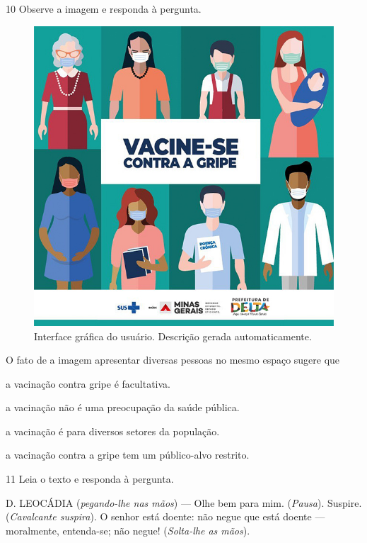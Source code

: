 \num{10} Observe a imagem e responda à pergunta.
 
\begin{figure}[htpb!]
\centering
\includegraphics[width=.7\textwidth]{./imgQ4PORT/media/image7.jpeg}
\caption{Interface gráfica do usuário. Descrição gerada automaticamente.}
\end{figure}


O fato de a imagem apresentar diversas pessoas no mesmo espaço sugere
que

\begin{escolha}
  \item a vacinação contra gripe é facultativa.

  \item a vacinação não é uma preocupação da saúde pública.

  \item a vacinação é para diversos setores da população.

  \item a vacinação contra a gripe tem um público-alvo restrito.
\end{escolha}

\num{11} Leia o texto e responda à pergunta.

\begin{myquote}
D. LEOCÁDIA (\textit{pegando-lhe nas mãos}) --- Olhe bem para mim. 
(\textit{Pausa}). Suspire. (\textit{Cavalcante suspira}). O senhor está
doente: não negue que está doente --- moralmente, entenda-se; não negue!
(\textit{Solta-lhe as mãos}).

\end{myquote}

